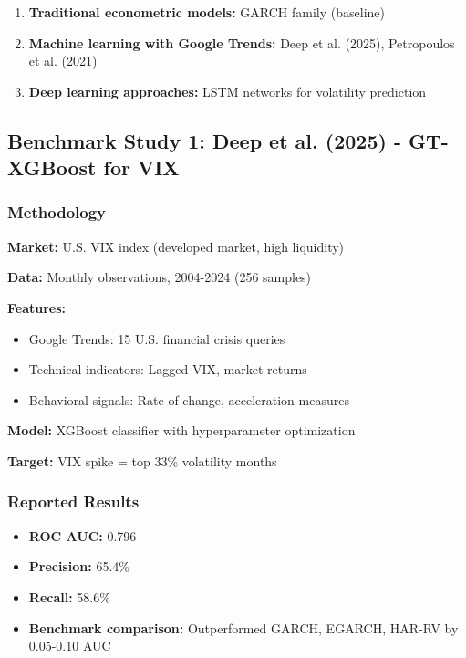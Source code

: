 \documentclass[12pt,a4paper]{article}
\begin{document}
\begin{enumerate}
    \item \textbf{Traditional econometric models:} GARCH family (baseline)
    \item \textbf{Machine learning with Google Trends:} Deep et al. (2025), Petropoulos et al. (2021)
    \item \textbf{Deep learning approaches:} LSTM networks for volatility prediction
\end{enumerate}

\subsection{Benchmark Study 1: Deep et al. (2025) - GT-XGBoost for VIX}

\subsubsection{Methodology}

\textbf{Market:} U.S. VIX index (developed market, high liquidity)

\textbf{Data:} Monthly observations, 2004-2024 (256 samples)

\textbf{Features:}
\begin{itemize}
    \item Google Trends: 15 U.S. financial crisis queries
    \item Technical indicators: Lagged VIX, market returns
    \item Behavioral signals: Rate of change, acceleration measures
\end{itemize}

\textbf{Model:} XGBoost classifier with hyperparameter optimization

\textbf{Target:} VIX spike = top 33\% volatility months

\subsubsection{Reported Results}

\begin{itemize}
    \item \textbf{ROC AUC:} 0.796
    \item \textbf{Precision:} 65.4\%
    \item \textbf{Recall:} 58.6\%
    \item \textbf{Benchmark comparison:} Outperformed GARCH, EGARCH, HAR-RV by 0.05-0.10 AUC
\end{itemize}
\end{document}
